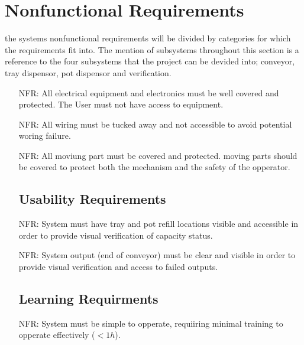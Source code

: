 \documentclass[12pt]{article}
\newcounter{nfrnum} %
\begin{document}
\section{Nonfunctional Requirements}
the systems nonfunctional requirements will be divided by categories for which the requirements fit into. The mention of subsystems
throughout this section is a reference to the four subsystems that the project can be devided into; conveyor, tray dispensor, pot dispensor and verification.

\noindent 
\begin{itemize}

\subsection{Appearance Requirements}
\item[NFR\refstepcounter{nfrnum}\thenfrnum \label{NFR_Accuracy}:]
  All electrical equipment and electronics must be well covered and protected. The User must not have access to equipment.

\item[NFR\refstepcounter{nfrnum}\thenfrnum \label{NFR_Usability}:]
  All wiring must be tucked away and not accessible to avoid potential woring failure.

\item[NFR\refstepcounter{nfrnum}\thenfrnum \label{NFR_Maintainability}:]
  All moviung part must be covered and protected. moving parts should be covered to protect both the mechanism and the safety of the opperator.

\subsection{Usability Requirements}

\item[NFR\refstepcounter{nfrnum}\thenfrnum \label{NFR_Portability}:]
System must have tray and pot refill locations visible and accessible in order to provide visual verification of capacity status.

\item[NFR\refstepcounter{nfrnum}\thenfrnum \label{NFR_Portability}:]
System output (end of conveyor) must be clear and visible in order to provide visual verification and access to failed outputs.

\subsection{Learning Requirments}
\item[NFR\refstepcounter{nfrnum}\thenfrnum \label{NFR_Portability}:]
System must be simple to opperate, requiiring minimal training to opperate effectively ($<1h$).


\end{itemize}
\end{document}
